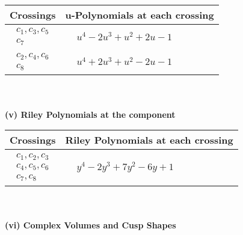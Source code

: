 \documentclass[1p]{elsarticle_modified}
\theoremstyle{definition}
\begin{document}
\begin{tabular}{m{50pt}|m{274pt}}
Crossings & \hspace{64pt}u-Polynomials at each crossing \\
\hline $$\begin{aligned}c_{1},c_{3},c_{5}\\c_{7}\end{aligned}$$&$\begin{aligned}
&u^4-2 u^3+u^2+2 u-1
\end{aligned}$\\
\hline $$\begin{aligned}c_{2},c_{4},c_{6}\\c_{8}\end{aligned}$$&$\begin{aligned}
&u^4+2 u^3+u^2-2 u-1
\end{aligned}$\\
\hline
\end{tabular}\\~\\
\newpage\renewcommand{\arraystretch}{1}
\flushleft \textbf{(v) Riley Polynomials at the component}\newline \\
\begin{tabular}{m{50pt}|m{274pt}}
Crossings & \hspace{64pt}Riley Polynomials at each crossing \\
\hline $$\begin{aligned}c_{1},c_{2},c_{3}\\c_{4},c_{5},c_{6}\\c_{7},c_{8}\end{aligned}$$&$\begin{aligned}
&y^4-2 y^3+7 y^2-6 y+1
\end{aligned}$\\
\hline
\end{tabular}\\~\\
\newpage\flushleft \textbf{(vi) Complex Volumes and Cusp Shapes}
\end{document}
